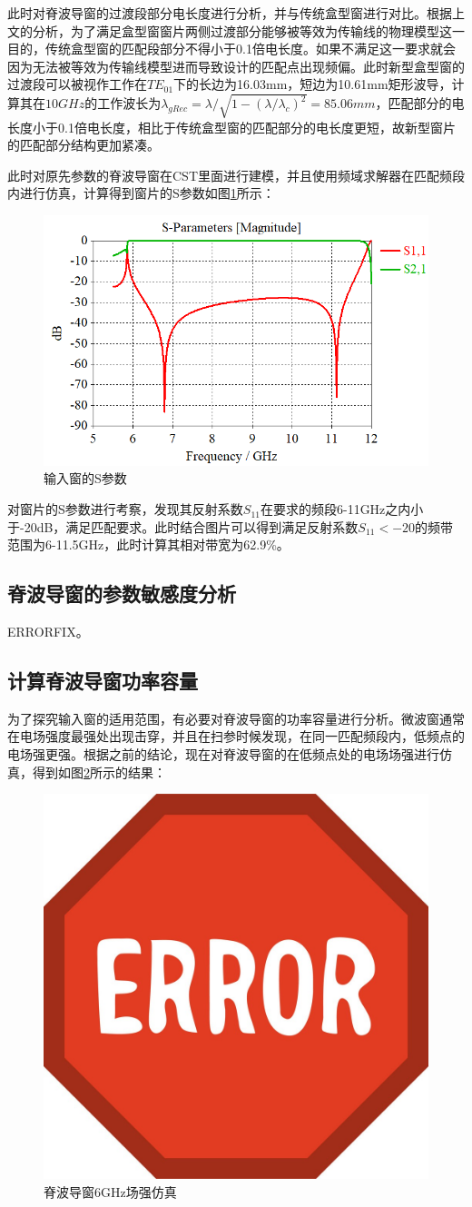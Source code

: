 \documentclass[master]{thesis-uestc}
\begin{document}
此时对脊波导窗的过渡段部分电长度进行分析，并与传统盒型窗进行对比。根据上文的分析，为了满足盒型窗窗片两侧过渡部分能够被等效为传输线的物理模型这一目的，传统盒型窗的匹配段部分不得小于0.1倍电长度。如果不满足这一要求就会因为无法被等效为传输线模型进而导致设计的匹配点出现频偏。此时新型盒型窗的过渡段可以被视作工作在$TE_{01}$下的长边为16.03mm，短边为10.61mm矩形波导，计算其在$10GHz$的工作波长为$\lambda_{gRec}=\lambda / \sqrt{1-(\lambda / \lambda_c)^2}=85.06mm$，匹配部分的电长度小于0.1倍电长度，相比于传统盒型窗的匹配部分的电长度更短，故新型窗片的匹配部分结构更加紧凑。

此时对原先参数的脊波导窗在CST里面进行建模，并且使用频域求解器在匹配频段内进行仿真，计算得到窗片的S参数如图\ref{fig:输入窗的S参数}所示：

\begin{figure}[!htb]
    \centering
    \includegraphics[width=0.5\linewidth]{pic/chapter3/脊波导窗S参数.png}
    \caption{输入窗的S参数}
    \label{fig:输入窗的S参数}
\end{figure}
对窗片的S参数进行考察，发现其反射系数$S_{11}$在要求的频段6-11GHz之内小于-20dB，满足匹配要求。此时结合图片可以得到满足反射系数$S_{11}<-20$的频带范围为6-11.5GHz，此时计算其相对带宽为62.9\%。
\subsection{脊波导窗的参数敏感度分析}
ERRORFIX。
\subsection{计算脊波导窗功率容量}
为了探究输入窗的适用范围，有必要对脊波导窗的功率容量进行分析。微波窗通常在电场强度最强处出现击穿，并且在扫参时候发现，在同一匹配频段内，低频点的电场强更强。根据之前的结论，现在对脊波导窗的在低频点处的电场场强进行仿真，得到如图\ref{fig:脊波导窗低频点场强仿真}所示的结果：
\begin{figure}[!htb]
    \centering
    \includegraphics[width=0.25\linewidth]{pic/ERROR.jpg}
    \caption{脊波导窗6GHz场强仿真}
    \label{fig:脊波导窗低频点场强仿真}
\end{figure}
\end{document}
